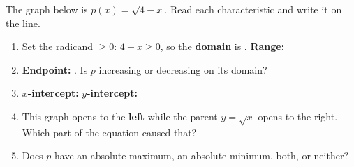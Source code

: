 \documentclass[10pt]{article}
\newcommand{\lgrid}[4]{%
  \draw[step=1, linegray!40, very thin] (#1,#3) grid (#2,#4);
  \draw[->, semithick, charcoal] (#1,0)--(#2,0) node[below right, font=\scriptsize]{$x$};
  \draw[->, semithick, charcoal] (0,#3)--(0,#4) node[left, font=\scriptsize]{$y$};}
\begin{document}
\begin{practicebox}
The graph below is $p(x) = \sqrt{4-x}$. Read each characteristic and write it on the line.
\begin{center}
\end{center}
\begin{enumerate}[leftmargin=1.7em, itemsep=3pt]
  \item Set the radicand $\ge 0$: $4-x\ge 0$, so the \textbf{domain} is \ans{$(-\infty,4]$}. \quad
        \textbf{Range:} \ans{$[0,\infty)$}
  \item \textbf{Endpoint:} . \quad Is $p$ increasing or decreasing on its domain?
  \item \textbf{$x$-intercept:}  \quad \textbf{$y$-intercept:} 
  \item This graph opens to the \textbf{left} while the parent $y=\sqrt{x}$ opens to the right.
        Which part of the equation caused that? 
  \item Does $p$ have an absolute maximum, an absolute minimum, both, or neither?
\end{enumerate}
\end{practicebox}
\end{document}
